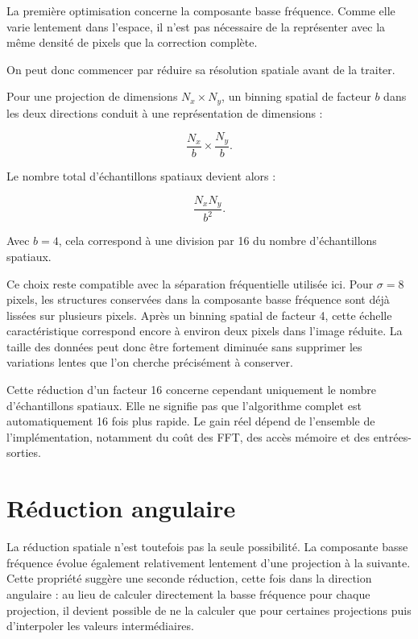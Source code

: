 \documentclass[11pt,a4paper]{report}
\begin{document}
La première optimisation concerne la composante basse fréquence.
Comme elle varie lentement dans l'espace, il n'est pas nécessaire de la
représenter avec la même densité de pixels que la correction complète.

On peut donc commencer par réduire sa résolution spatiale avant de la traiter. 


Pour une projection de dimensions $N_x\times N_y$, un binning spatial
de facteur $b$ dans les deux directions conduit à une représentation de
dimensions :

\begin{equation}
\frac{N_x}{b}
\times
\frac{N_y}{b}.
\end{equation}

Le nombre total d'échantillons spatiaux devient alors :

\begin{equation}
\frac{N_xN_y}{b^2}.
\end{equation}

Avec $b=4$, cela correspond à une division par 16 du nombre
d'échantillons spatiaux.



Ce choix reste compatible avec la séparation fréquentielle utilisée ici.
Pour $\sigma=8$ pixels, les structures conservées dans la composante basse
fréquence sont déjà lissées sur plusieurs pixels. Après un binning spatial
de facteur 4, cette échelle caractéristique correspond encore à environ
deux pixels dans l'image réduite. La taille des données peut donc être
fortement diminuée sans supprimer les variations lentes que l'on cherche
précisément à conserver.

Cette réduction d'un facteur 16 concerne cependant uniquement le nombre
d'échantillons spatiaux. Elle ne signifie pas que l'algorithme complet est
automatiquement 16 fois plus rapide. Le gain réel dépend de l'ensemble de
l'implémentation, notamment du coût des FFT, des accès mémoire et des
entrées-sorties.

\section{Réduction angulaire}


La réduction spatiale n'est toutefois pas la seule possibilité. La
composante basse fréquence évolue également relativement lentement d'une
projection à la suivante. Cette propriété suggère une seconde réduction,
cette fois dans la direction angulaire : au lieu de calculer directement
la basse fréquence pour chaque projection, il devient possible de ne la
calculer que pour certaines projections puis d'interpoler les valeurs
intermédiaires.
\end{document}
